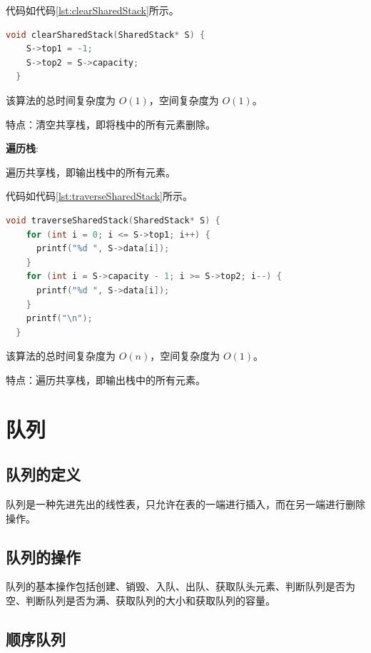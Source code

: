 \documentclass[lang=cn,newtx,10pt,scheme=chinese]{elegantbook}
\begin{document}
代码如代码\ref{lst:clearSharedStack}所示。

\begin{lstlisting}[language=C++, caption={清空共享栈示例代码}, label={lst:clearSharedStack}]
  void clearSharedStack(SharedStack* S) {
    S->top1 = -1;
    S->top2 = S->capacity;
  }

\end{lstlisting}

该算法的总时间复杂度为 $O(1)$，空间复杂度为 $O(1)$。

特点：清空共享栈，即将栈中的所有元素删除。

\textbf{遍历栈}:

遍历共享栈，即输出栈中的所有元素。

代码如代码\ref{lst:traverseSharedStack}所示。

\begin{lstlisting}[language=C++, caption={遍历共享栈示例代码}, label={lst:traverseSharedStack}]
  void traverseSharedStack(SharedStack* S) {
    for (int i = 0; i <= S->top1; i++) {
      printf("%d ", S->data[i]);
    }
    for (int i = S->capacity - 1; i >= S->top2; i--) {
      printf("%d ", S->data[i]);
    }
    printf("\n");
  }

\end{lstlisting}

该算法的总时间复杂度为 $O(n)$，空间复杂度为 $O(1)$。

特点：遍历共享栈，即输出栈中的所有元素。


\section{队列}



\subsection{队列的定义}

队列是一种先进先出的线性表，只允许在表的一端进行插入，而在另一端进行删除操作。


\subsection{队列的操作}

队列的基本操作包括创建、销毁、入队、出队、获取队头元素、判断队列是否为空、判断队列是否为满、获取队列的大小和获取队列的容量。


\subsection{顺序队列}
\end{document}
